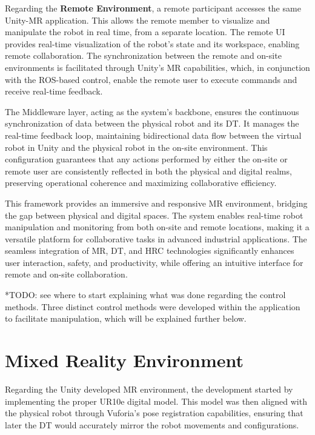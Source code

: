 Regarding the \textbf{Remote Environment}, a remote participant accesses the same Unity-\ac{MR} application. This allows the remote member to visualize and manipulate the robot in real time, from a separate location. The remote \ac{UI} provides real-time visualization of the robot’s state and its workspace, enabling remote collaboration. The synchronization between the remote and on-site environments is facilitated through Unity’s \ac{MR} capabilities, which, in conjunction with the \ac{ROS}-based control, enable the remote user to execute commands and receive real-time feedback.

The Middleware layer, acting as the system’s backbone, ensures the continuous synchronization of data between the physical robot and its \ac{DT}. It manages the real-time feedback loop, maintaining bidirectional data flow between the virtual robot in Unity and the physical robot in the on-site environment. This configuration guarantees that any actions performed by either the on-site or remote user are consistently reflected in both the physical and digital realms, preserving operational coherence and maximizing collaborative efficiency.

This framework provides an immersive and responsive \ac{MR} environment, bridging the gap between physical and digital spaces. The system enables real-time robot manipulation and monitoring from both on-site and remote locations, making it a versatile platform for collaborative tasks in advanced industrial applications. The seamless integration of \ac{MR}, \ac{DT}, and \ac{HRC} technologies significantly enhances user interaction, safety, and productivity, while offering an intuitive interface for remote and on-site collaboration.


*TODO: see where to start explaining what was done regarding the control methods.
Three distinct control methods were developed within the application to facilitate manipulation, which will be explained further below.


\section{Mixed Reality Environment}

Regarding the Unity developed \ac{MR} environment, the development started by implementing the proper UR10e digital model. This model was then aligned with the physical robot through Vuforia's pose registration capabilities, ensuring that later the \ac{DT} would accurately mirror the robot movements and configurations.

